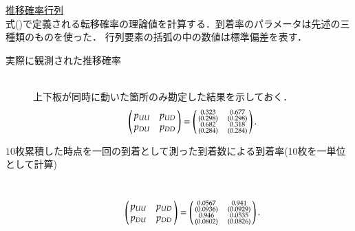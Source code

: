 \documentclass[a4j,papersize,disablejfam,slide,14pt]{jsarticle}
\begin{document}
\underline{\large 推移確率行列}\\
	式()で定義される転移確率の理論値を計算する．到着率のパラメータは先述の三種類のものを使った．
    行列要素の括弧の中の数値は標準偏差を表す．
    \begin{description}
    	\item[実際に観測された推移確率]\mbox{}\\
        	上下板が同時に動いた箇所のみ勘定した結果を示しておく．
        	\begin{align}
    			\left(
    			\begin{array}{@{\,}cc@{\,}}
    				p_{UU} & p_{UD} \\
            		p_{DU} & p_{DD}
    			\end{array}
    			\right)
                = \left(
    			\begin{array}{@{\,}cc@{\,}}
    				\substack{0.323 \\ (0.298)} & \substack{0.677 \\ (0.298)} \\
            		\substack{0.682 \\ (0.284)} & \substack{0.318 \\ (0.284)}
    			\end{array}
    			\right).
    		\end{align}

        \item[$10$枚累積した時点を一回の到着として測った到着数による到着率(10枚を一単位として計算)]\mbox{}\\
        	\begin{align}
    			\left(
    			\begin{array}{@{\,}cc@{\,}}
    				p_{UU} & p_{UD} \\
            		p_{DU} & p_{DD}
    			\end{array}
    			\right)
                = \left(
    			\begin{array}{@{\,}cc@{\,}}
    				\substack{0.0567 \\ (0.0936)} & \substack{0.941 \\ (0.0929)} \\
            		\substack{0.946 \\ (0.0802)} & \substack{0.0535 \\ (0.0826)}
    			\end{array}
    			\right).
    		\end{align}
        

\end{description}
\end{document}
